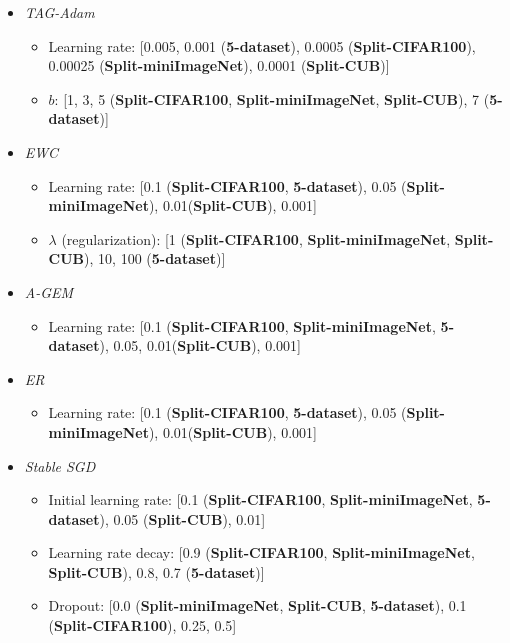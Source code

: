 \documentclass{article} \usepackage{collas2022_conference,times}
\begin{document}
\begin{itemize}
\begin{itemize}
    \end{itemize}
    \item \textit{TAG-Adam}
    \begin{itemize}
        \item Learning rate: [0.005, 0.001 (\textbf{5-dataset}), 0.0005 (\textbf{Split-CIFAR100}), 0.00025 (\textbf{Split-miniImageNet}), 0.0001 (\textbf{Split-CUB})]
        \item $b$: [1, 3, 5 (\textbf{Split-CIFAR100}, \textbf{Split-miniImageNet}, \textbf{Split-CUB}), 7 (\textbf{5-dataset})] 
    \end{itemize}
    \item \textit{EWC}
    \begin{itemize}
        \item Learning rate: [0.1 (\textbf{Split-CIFAR100}, \textbf{5-dataset}), 0.05 (\textbf{Split-miniImageNet}), 0.01(\textbf{Split-CUB}), 0.001]
        \item $\lambda$ (regularization): [1 (\textbf{Split-CIFAR100}, \textbf{Split-miniImageNet}, \textbf{Split-CUB}), 10, 100 (\textbf{5-dataset})]
    \end{itemize}
    \item \textit{A-GEM}
    \begin{itemize}
        \item Learning rate: [0.1 (\textbf{Split-CIFAR100}, \textbf{Split-miniImageNet}, \textbf{5-dataset}), 0.05, 0.01(\textbf{Split-CUB}), 0.001]
    \end{itemize}
    \item \textit{ER}
    \begin{itemize}
        \item Learning rate: [0.1 (\textbf{Split-CIFAR100}, \textbf{5-dataset}), 0.05 (\textbf{Split-miniImageNet}), 0.01(\textbf{Split-CUB}), 0.001]
    \end{itemize}
    \item \textit{Stable SGD}
    \begin{itemize}
        \item Initial learning rate: [0.1 (\textbf{Split-CIFAR100}, \textbf{Split-miniImageNet}, \textbf{5-dataset}), 0.05 (\textbf{Split-CUB}), 0.01]
        \item Learning rate decay: [0.9 (\textbf{Split-CIFAR100}, \textbf{Split-miniImageNet}, \textbf{Split-CUB}), 0.8, 0.7 (\textbf{5-dataset})]
        \item Dropout: [0.0 (\textbf{Split-miniImageNet}, \textbf{Split-CUB}, \textbf{5-dataset}), 0.1 (\textbf{Split-CIFAR100}), 0.25, 0.5]
    \end{itemize}

\end{itemize}
\end{document}
